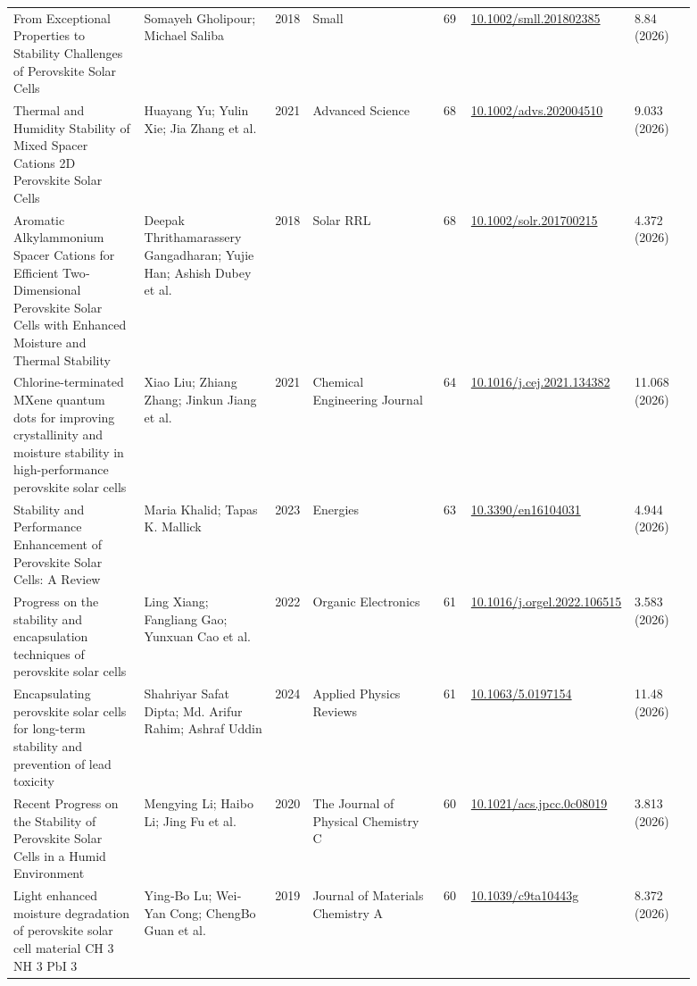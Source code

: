 \documentclass[10pt,a4paper]{article}
\begin{document}
{\begin{longtable}{p{0.197\linewidth}p{0.197\linewidth}p{0.043\linewidth}p{0.197\linewidth}p{0.043\linewidth}p{0.117\linewidth}p{0.098\linewidth}}
From Exceptional Properties to Stability Challenges of Perovskite Solar Cells & Somayeh Gholipour; Michael Saliba & 2018 & Small & 69 & \href{https://doi.org/10.1002/smll.201802385}{10.1002/smll.201802385} & 8.84 (2026) \\
Thermal and Humidity Stability of Mixed Spacer Cations 2D Perovskite Solar Cells & Huayang Yu; Yulin Xie; Jia Zhang et al. & 2021 & Advanced Science & 68 & \href{https://doi.org/10.1002/advs.202004510}{10.1002/advs.202004510} & 9.033 (2026) \\
Aromatic Alkylammonium Spacer Cations for Efficient Two‐Dimensional Perovskite Solar Cells with Enhanced Moisture and Thermal Stability & Deepak Thrithamarassery Gangadharan; Yujie Han; Ashish Dubey et al. & 2018 & Solar RRL & 68 & \href{https://doi.org/10.1002/solr.201700215}{10.1002/solr.201700215} & 4.372 (2026) \\
Chlorine-terminated MXene quantum dots for improving crystallinity and moisture stability in high-performance perovskite solar cells & Xiao Liu; Zhiang Zhang; Jinkun Jiang et al. & 2021 & Chemical Engineering Journal & 64 & \href{https://doi.org/10.1016/j.cej.2021.134382}{10.1016/j.cej.2021.134382} & 11.068 (2026) \\
Stability and Performance Enhancement of Perovskite Solar Cells: A Review & Maria Khalid; Tapas K. Mallick & 2023 & Energies & 63 & \href{https://doi.org/10.3390/en16104031}{10.3390/en16104031} & 4.944 (2026) \\
Progress on the stability and encapsulation techniques of perovskite solar cells & Ling Xiang; Fangliang Gao; Yunxuan Cao et al. & 2022 & Organic Electronics & 61 & \href{https://doi.org/10.1016/j.orgel.2022.106515}{10.1016/j.orgel.2022.106515} & 3.583 (2026) \\
Encapsulating perovskite solar cells for long-term stability and prevention of lead toxicity & Shahriyar Safat Dipta; Md. Arifur Rahim; Ashraf Uddin & 2024 & Applied Physics Reviews & 61 & \href{https://doi.org/10.1063/5.0197154}{10.1063/5.0197154} & 11.48 (2026) \\
Recent Progress on the Stability of Perovskite Solar Cells in a Humid Environment & Mengying Li; Haibo Li; Jing Fu et al. & 2020 & The Journal of Physical Chemistry C & 60 & \href{https://doi.org/10.1021/acs.jpcc.0c08019}{10.1021/acs.jpcc.0c08019} & 3.813 (2026) \\
Light enhanced moisture degradation of perovskite solar cell material CH 3 NH 3 PbI 3 & Ying‐Bo Lu; Wei‐Yan Cong; ChengBo Guan et al. & 2019 & Journal of Materials Chemistry A & 60 & \href{https://doi.org/10.1039/c9ta10443g}{10.1039/c9ta10443g} & 8.372 (2026) \\

\end{longtable}}
\end{document}
